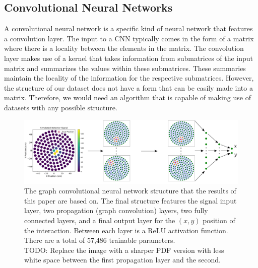 \subsection{Convolutional Neural Networks}
A convolutional neural network is a specific kind of neural network that features a convolution layer.
The input to a CNN typically comes in the form of a matrix where there is a locality between the elements in the matrix.
The convolution layer makes use of a kernel that takes information from submatrices of the input matrix and summarizes the values within these submatrices.
These summaries maintain the locality of the information for the respective submatrices.
However, the structure of our dataset does not have a form that can be easily made into a matrix.
Therefore, we would need an algorithm that is capable of making use of datasets with any possible structure.
\begin{figure}[t]
	\centering
	\includegraphics[width=\linewidth]{figures/GCNN_Structure.png}
	\caption{
	The graph convolutional neural network structure that the results of this paper are based on.
	The final structure features the signal input layer, two propagation (graph convolution) layers, two fully connected layers, and a final output layer for the $(x,y)$ position of the interaction.
	Between each layer is a ReLU activation function.
	There are a total of 57,486 trainable parameters.
	\\ TODO: Replace the image with a sharper PDF version with less white space between the first propagation layer and the second.
	}
	\label{fig:figures/GCNN_Structure}
\end{figure}
